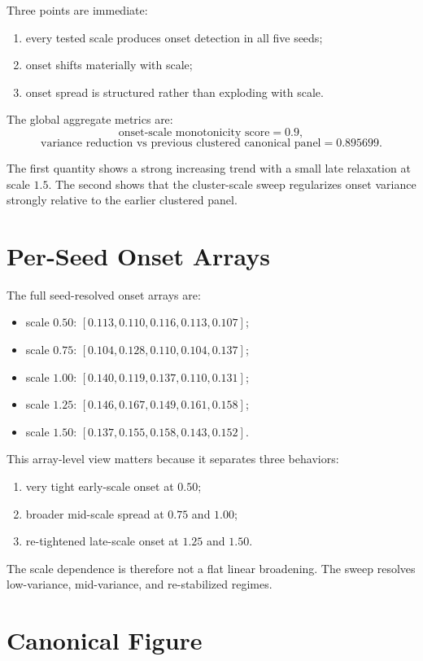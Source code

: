 \documentclass[11pt]{article}
\begin{document}
Three points are immediate:
\begin{enumerate}
\item every tested scale produces onset detection in all five seeds;
\item onset shifts materially with scale;
\item onset spread is structured rather than exploding with scale.
\end{enumerate}

The global aggregate metrics are:
\[
\text{onset-scale monotonicity score} = 0.9,
\]
\[
\text{variance reduction vs previous clustered canonical panel} = 0.895699.
\]

The first quantity shows a strong increasing trend with a small late relaxation at scale $1.5$. The second shows that the cluster-scale sweep regularizes onset variance strongly relative to the earlier clustered panel.

\section{Per-Seed Onset Arrays}

The full seed-resolved onset arrays are:
\begin{itemize}
\item scale $0.50$: $[0.113, 0.110, 0.116, 0.113, 0.107]$;
\item scale $0.75$: $[0.104, 0.128, 0.110, 0.104, 0.137]$;
\item scale $1.00$: $[0.140, 0.119, 0.137, 0.110, 0.131]$;
\item scale $1.25$: $[0.146, 0.167, 0.149, 0.161, 0.158]$;
\item scale $1.50$: $[0.137, 0.155, 0.158, 0.143, 0.152]$.
\end{itemize}

This array-level view matters because it separates three behaviors:
\begin{enumerate}
\item very tight early-scale onset at $0.50$;
\item broader mid-scale spread at $0.75$ and $1.00$;
\item re-tightened late-scale onset at $1.25$ and $1.50$.
\end{enumerate}

The scale dependence is therefore not a flat linear broadening. The sweep resolves low-variance, mid-variance, and re-stabilized regimes.

\section{Canonical Figure}
\end{document}

